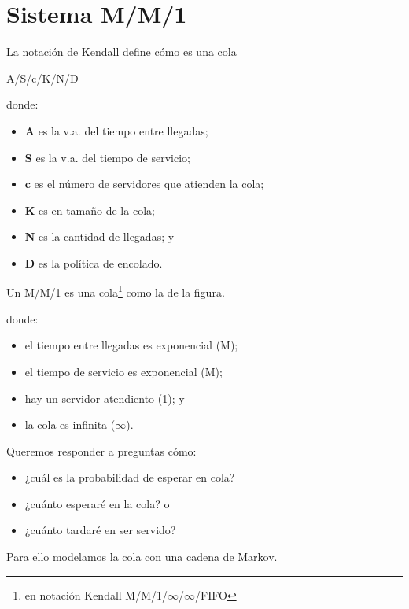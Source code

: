 \documentclass[xcolor={x11names}]{beamer}
\begin{document}
\section{Sistema M/M/1}

\begin{frame}{\secname}
    La notación de Kendall define cómo es 
    una cola
    \begin{center}
        A/S/c/K/N/D 
    \end{center}
    donde:
    \begin{itemize}
        \item \textbf{A} es la v.a. del tiempo
            entre llegadas;
        \item \textbf{S} es la v.a. del tiempo
            de servicio;
        \item \textbf{c} es el número de
            servidores que atienden la cola;
        \item \textbf{K} es en tamaño de la cola;
        \item \textbf{N} es la cantidad de
            llegadas; y
        \item \textbf{D} es la política de
            encolado.
    \end{itemize}
\end{frame}




\begin{frame}{\secname}
    Un M/M/1 es una cola\footnote{en notación
    Kendall M/M/1/$\infty$/$\infty$/FIFO}
    como la de la figura.

    \begin{figure}
        
    \end{figure}

    donde:
    \begin{itemize}
        \item el tiempo entre llegadas es
            exponencial (M);
        \item el tiempo de servicio es
            exponencial (M);
        \item hay un servidor atendiento (1); y
        \item la cola es infinita ($\infty$).
    \end{itemize}

\end{frame}




\begin{frame}{\secname}
    Queremos responder a preguntas cómo:
    \begin{itemize}
        \item ¿cuál es la probabilidad
            de esperar en cola?
        \item ¿cuánto esperaré en la cola? o
        \item ¿cuánto tardaré en ser servido?
    \end{itemize}

    \vfill

    Para ello modelamos la cola con una
    cadena de Markov.
\end{frame}
\end{document}

